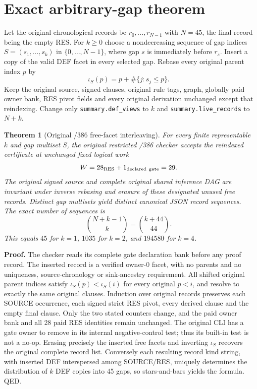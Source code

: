 \documentclass[11pt]{article}
\newtheorem{theorem}{Theorem}
\begin{document}
\section*{Exact arbitrary-gap theorem}
Let the original chronological records be $r_0,\ldots,r_{N-1}$ with $N=45$, the final record being the empty RES. For $k\ge0$ choose a nondecreasing sequence of gap indices $S=(s_1,\ldots,s_k)$ in $\{0,\ldots,N-1\}$, where gap $s$ is immediately before $r_s$. Insert a copy of the valid DEF facet in every selected gap. Rebase every original parent index $p$ by
\[
\iota_S(p)=p+\#\{j:s_j\le p\}.
\]
Keep the original source, signed clauses, original rule tags, graph, globally paid owner bank, RES pivot fields and every original derivation unchanged except that reindexing. Change only \texttt{summary.def\_views} to $k$ and \texttt{summary.live\_records} to $N+k$.

\begin{theorem}[Original /386 free-facet interleaving]
For every finite representable $k$ and gap multiset $S$, the original restricted /386 checker accepts the reindexed certificate at unchanged fixed logical work
\[
W=28_{\rm RES}+1_{\rm declared\ gate}=29.
\]
The original signed source and complete original shared inference DAG are invariant under inverse rebasing and erasure of \emph{these designated unused} free records. Distinct gap multisets yield distinct canonical JSON record sequences. The exact number of sequences is
\[
\boxed{\binom{N+k-1}{k}=\binom{k+44}{44}}.
\]
This equals $45$ for $k=1$, $1035$ for $k=2$, and $194580$ for $k=4$.
\end{theorem}
\noindent\textbf{Proof.} The checker reads its complete gate declaration bank before any proof record. The inserted record is a verified owner-0 facet, with no parents and no uniqueness, source-chronology or sink-ancestry requirement. All shifted original parent indices satisfy $\iota_S(p)<\iota_S(i)$ for every original $p<i$, and resolve to exactly the same original clauses. Induction over original records preserves each SOURCE occurrence, each signed strict RES pivot, every derived clause and the empty final clause. Only the two stated counters change, and the paid owner bank and all 28 paid RES identities remain unchanged. The original CLI has a gate owner to remove in its internal negative-control test; thus its built-in test is not a no-op. Erasing precisely the inserted free facets and inverting $\iota_S$ recovers the original complete record list. Conversely each resulting record kind string, with inserted DEF interspersed among SOURCE/RES, uniquely determines the distribution of $k$ DEF copies into 45 gaps, so stars-and-bars yields the formula. QED.
\end{document}
